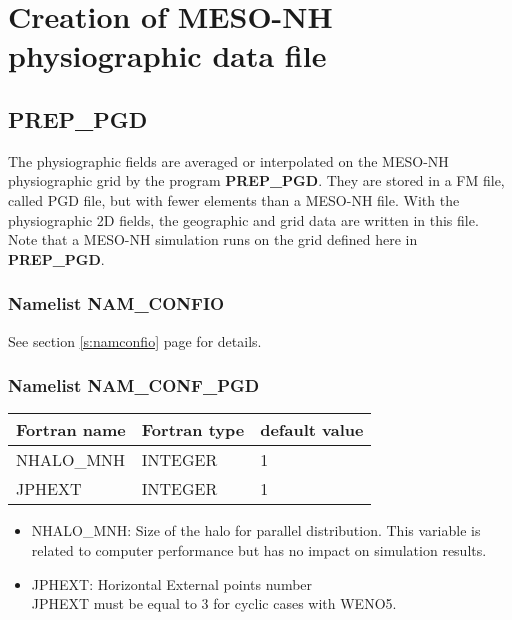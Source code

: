 \chapter{Creation of MESO-NH physiographic data file} \label{c:PGD}


\section{\bf PREP\_PGD}
The physiographic fields are averaged or interpolated on the MESO-NH
physiographic grid by the program {\bf PREP\_PGD}. 
They are stored in a FM file, called PGD file, but with fewer elements than a MESO-NH file.
With the physiographic 2D fields, the geographic and grid data
are written in this file.
Note that a MESO-NH simulation runs on the grid defined here in 
{\bf PREP\_PGD}. \\

\subsection{Namelist NAM\_CONFIO}
See section \ref{s:namconfio} page \pageref{s:namconfio} for details.

\subsection{Namelist NAM\_CONF\_PGD}
\begin{center}
\begin{tabular} {|l|l|l|}
\hline
Fortran name & Fortran type & default value\\
\hline
\hline
NHALO\_MNH  & INTEGER & 1 \\
JPHEXT      & INTEGER & 1 \\
\hline
\end{tabular}
\end{center}

\begin{itemize}
\item
NHALO\_MNH: Size of the halo for parallel distribution.
This variable is related to computer performance but has no
impact on simulation results.\\

\item
JPHEXT:  Horizontal External points number\\
JPHEXT must be equal to 3 for cyclic cases with WENO5.
\end{itemize}




